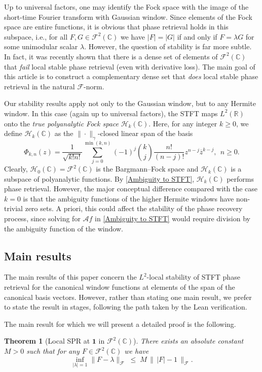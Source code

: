 \documentclass[11pt]{amsart}
\newtheorem{theorem}{Theorem}[section]
\theoremstyle{remark}
\begin{document}
Up to universal factors, one may identify the Fock space with the image of the short-time Fourier transform with Gaussian window.
Since elements of the Fock space are entire functions, it is obvious that phase retrieval holds in this subspace, i.e., for all $F,G\in \mathcal{F}^2(\mathbb{C})$ we have $|F|=|G|$ if and only if $F=\lambda G$ for some unimodular scalar $\lambda$. However, the question of stability is far more subtle. In fact, it was recently shown that there is a dense set of elements of $\mathcal{F}^2(\mathbb{C})$ that \emph{fail} local stable phase retrieval (even with derivative loss). The main goal of this article is to construct a complementary dense set that \emph{does} local stable phase retrieval in the natural $\mathcal{F}$-norm.
\medskip

Our stability results  apply not only to the Gaussian window, but to any Hermite window. In this case (again up to universal factors), the STFT maps $L^2(\mathbb{R})$ onto the \emph{true polyanalytic Fock space} $\mathcal{H}_k(\mathbb{C})$. Here, for any integer $k\geq 0$, we define $\mathcal{H}_k(\mathbb{C})$ as the $\|\cdot\|_\gamma$-closed linear span of the  basis
\begin{equation*}
    \Phi_{k,n}(z)=\frac{1}{\sqrt{k!n!}}\sum_{j=0}^{\min(k,n)}(-1)^j{k\choose j}\frac{n!}{(n-j)!}z^{n-j}\overline{z}^{k-j}, \ \ n\geq 0.
\end{equation*}
Clearly, $\mathcal{H}_0(\mathbb{C})=\mathcal{F}^2(\mathbb{C})$ is the Bargmann--Fock space and $\mathcal{H}_k(\mathbb{C})$ is a subspace of polyanalytic functions. By \eqref{Ambiguity to STFT}, $\mathcal{H}_k(\mathbb{C})$  performs phase retrieval. However, the major conceptual difference compared with the case $k=0$ is that the ambiguity functions of the higher Hermite windows have non-trivial zero sets. A priori, this could affect the stability of the phase recovery process, since solving for $\mathcal{A}f$ in \eqref{Ambiguity to STFT} would require division by the ambiguity function of the window.
\subsection{Main results}
The main results of this paper concern the $L^2$-local stability of STFT phase retrieval for the canonical window functions at elements of the span of the canonical basis vectors. However, rather than stating one main result, we prefer to state the result in stages, following the path taken by the Lean verification. 
\medskip

The main result for which we will present a detailed proof is the following.
\begin{theorem}[Local SPR at $\mathbf{1}$ in $\mathcal{F}^2(\mathbb{C})$]\label{main:local}
There exists an absolute constant $M> 0$ such
that for any $F\in \mathcal{F}^2(\mathbb{C})$ we have
\[
\inf_{|\lambda|=1}\lVert F - \lambda \rVert_{\mathcal{F}}
\;\le\;
M\,
\bigl\|\, \lvert F \rvert - 1 \,\bigr\|_{\mathcal{F}}.
\]
\end{theorem}
\end{document}

